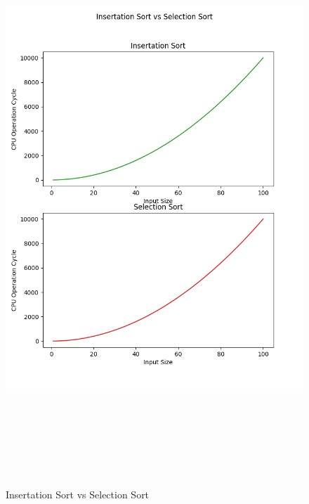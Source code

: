 \documentclass{article}
\begin{document}
\begin{figure}[h]
    \centerline{\includegraphics[width=7in,height=8.5in]{Insertation Sort_Selection Sort.png}}
    \caption{Insertation Sort vs Selection Sort}
\end{figure}
\end{document}
